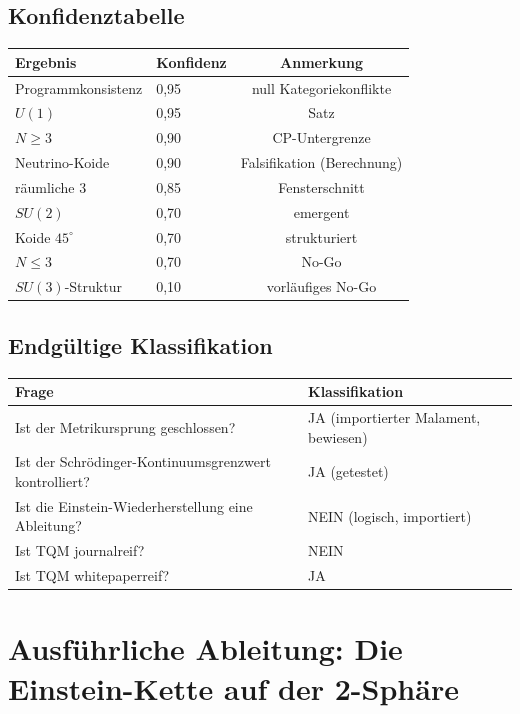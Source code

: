 \documentclass[10pt,twoside,openany]{book}
\begin{document}
\section{Konfidenztabelle}

\begin{center}
\begin{tabular}{llc}
\toprule
Ergebnis & Konfidenz & Anmerkung \\
\midrule
Programmkonsistenz & 0,95 & null Kategoriekonflikte \\
$U(1)$ & 0,95 & Satz \\
$N\ge3$ & 0,90 & CP-Untergrenze \\
Neutrino-Koide & 0,90 & Falsifikation (Berechnung) \\
räumliche 3 & 0,85 & Fensterschnitt \\
$SU(2)$ & 0,70 & emergent \\
Koide $45^\circ$ & 0,70 & strukturiert \\
$N\le3$ & 0,70 & No-Go \\
$SU(3)$-Struktur & 0,10 & vorläufiges No-Go \\
\bottomrule
\end{tabular}
\end{center}

\section{Endgültige Klassifikation}

\begin{center}
\begin{tabular}{ll}
\toprule
Frage & Klassifikation \\
\midrule
Ist der Metrikursprung geschlossen? & JA (importierter Malament, bewiesen) \\
Ist der Schr\"odinger-Kontinuumsgrenzwert kontrolliert? & JA (getestet) \\
Ist die Einstein-Wiederherstellung eine Ableitung? & NEIN (logisch, importiert) \\
Ist TQM journalreif? & NEIN \\
Ist TQM whitepaperreif? & JA \\
\bottomrule
\end{tabular}
\end{center}


\chapter{Ausführliche Ableitung: Die Einstein-Kette auf der 2-Sphäre}
\label{app:worked}
\end{document}
